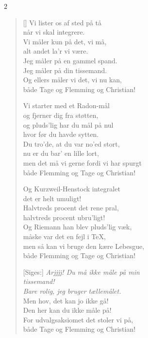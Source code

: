 \begin{multicols}2
\settowidth{\versewidth}{men det må vi gerne fordi vi har spurgt}
\begin{verse}[\versewidth]
Vi lister os af sted på tå\\
når vi skal integrere.\\
Vi måler kun på det, vi må,\\
alt andet la’r vi være.\\
Jeg måler på en gammel spand.\\
Jeg måler på din tissemand.\\
Og ellers måler vi det, vi nu kan,\\
både Tage og Flemming og Christian!

Vi starter med et Radon-mål\\
og fjerner dig fra støtten,\\
og pluds’lig har du mål på nul\\
hvor før du havde sytten.\\
Du tro’de, at du var no’ed stort,\\
nu er du bar’ en lille lort,\\
men det må vi gerne fordi vi har spurgt\\
både Flemming og Tage og Christian!

Og Kurzweil-Henstock integralet\\
det er helt umuligt!\\
Halvtreds procent det rene pral,\\
halvtreds procent ubru’ligt!\\
Og Riemann han blev pluds’lig væk,\\
måske var det en fejl i \TeX,\\
men så kan vi bruge den kære Lebesgue,\\
både Flemming og Tage og Christian!


[Siges:] \emph{Arjjjj! Du må ikke måle på min}\\
\vinphantom{[Siges:] }\emph{tissemand!}\\
\vinphantom{[Siges:] }\emph{Bare rolig, jeg bruger tællemålet.}\\
Men hov, det kan jo ikke gå!\\
Den her kan du ikke måle på!\\
For udvalgsaksiomet det stoler vi på,\\
både Tage og Flemming og Christian!
\end{verse}
\end{multicols}


